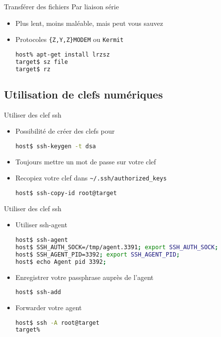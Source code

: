 \begin{frame}[fragile=singleslide]{Transférer des fichiers}
  Par liaison série
  \begin{itemize}
  \item Plus lent, moins maléable, mais peut vous sauvez
  \item Protocoles \verb+{Z,Y,Z}MODEM+ ou \verb+Kermit+
\begin{lstlisting}[language=sh]
host% apt-get install lrzsz 
target$ sz file
target$ rz
\end{lstlisting} %
  \end{itemize}
\end{frame}

\subsection{Utilisation de clefs numériques}

\begin{frame}[fragile=singleslide]{Utiliser des clef ssh}
  \begin{itemize}
  \item Possibilité de créer des clefs pour 
\begin{lstlisting}[language=sh]
host$ ssh-keygen -t dsa
\end{lstlisting} %
  \item Toujours mettre un mot de passe sur votre clef
  \item Recopiez votre clef dans \verb+~/.ssh/authorized_keys+
\begin{lstlisting}[language=sh]
host$ ssh-copy-id root@target
\end{lstlisting} %
  \end{itemize}
\end{frame}

\begin{frame}[fragile=singleslide]{Utiliser des clef ssh}
  \begin{itemize}
  \item Utiliser ssh-agent
\begin{lstlisting}[language=sh]
host$ ssh-agent
host$ SSH_AUTH_SOCK=/tmp/agent.3391; export SSH_AUTH_SOCK;
host$ SSH_AGENT_PID=3392; export SSH_AGENT_PID;
host$ echo Agent pid 3392;
\end{lstlisting} %
  \item Enregistrer votre passphrase auprès de l'agent
\begin{lstlisting}[language=sh]
host$ ssh-add
\end{lstlisting} %
  \item Forwarder votre agent
\begin{lstlisting}[language=sh]
host$ ssh -A root@target
target% 
\end{lstlisting} %
  \end{itemize}
\end{frame}


